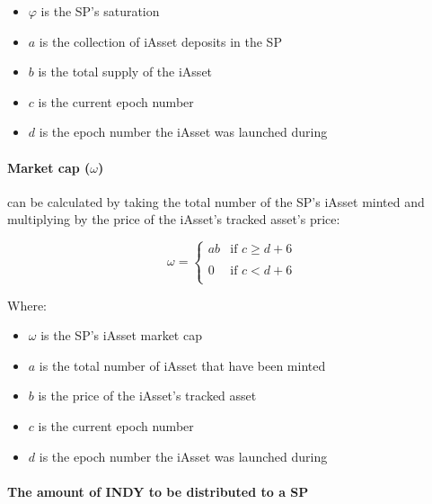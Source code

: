 \documentclass{article}
\begin{document}
\begin{sloppypar}
\begin{itemize}
\item
  \(\varphi\) is the SP's saturation
\item
  \(a\) is the collection of iAsset deposits in the SP
\item
  \(b\) is the total supply of the iAsset
\item
  \(c\) is the current epoch number
\item
  \(d\) is the epoch number the iAsset was launched during
\end{itemize}

\filbreak

\hypertarget{market-cap-omega}{%
\paragraph{\texorpdfstring{Market cap
(\(\omega\))}{Market cap (\textbackslash omega)}}\label{market-cap-omega}}

can be calculated by taking the total number of the SP's iAsset minted
and multiplying by the price of the iAsset's tracked asset's price:

\[\omega = \left\{ \begin{matrix}
  ab & \text{if\ }c \geq d + 6 \\ \\
  0 & \text{if\ }c < d + 6 \\
  \end{matrix} \right.\ \]

Where:

\begin{itemize}
\item
  \(\omega\) is the SP's iAsset market cap
\item
  \(a\) is the total number of iAsset that have been minted
\item
  \(b\) is the price of the iAsset's tracked asset
\item
  \(c\) is the current epoch number
\item
  \(d\) is the epoch number the iAsset was launched during
\end{itemize}

\filbreak

\hypertarget{the-amount-of-indy-to-be-distributed-to-a-sp}{%
\paragraph{The amount of INDY to be distributed to a
SP}\label{the-amount-of-indy-to-be-distributed-to-a-sp}}


\end{sloppypar}
\end{document}

